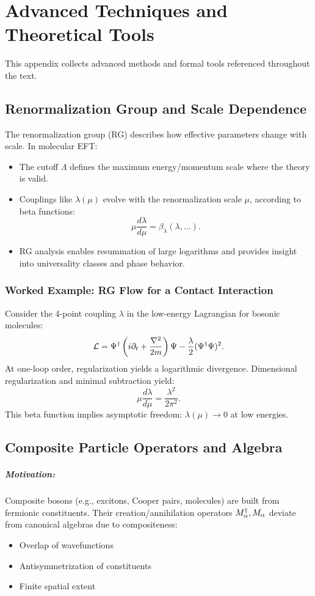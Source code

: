 \chapter{Advanced Techniques and Theoretical Tools}
\label{app:techniques}

This appendix collects advanced methods and formal tools referenced throughout the text.

\section{Renormalization Group and Scale Dependence}
\label{app:rg}

The renormalization group (RG) describes how effective parameters change with scale. In molecular EFT:
\begin{itemize}
  \item The cutoff \(\Lambda\) defines the maximum energy/momentum scale where the theory is valid.
  \item Couplings like \(\lambda(\mu)\) evolve with the renormalization scale \(\mu\), according to beta functions:
  \[ \mu \frac{d\lambda}{d\mu} = \beta_\lambda(\lambda, \dots). \]
  \item RG analysis enables resummation of large logarithms and provides insight into universality classes and phase behavior.
\end{itemize}

\subsection*{Worked Example: RG Flow for a Contact Interaction}
Consider the 4-point coupling \(\lambda\) in the low-energy Lagrangian for bosonic molecules:
\[
  \mathcal{L} = \Psi^\dagger \left(i\partial_t + \frac{\nabla^2}{2m}\right) \Psi - \frac{\lambda}{2} (\Psi^\dagger \Psi)^2.
\]
At one-loop order, regularization yields a logarithmic divergence. Dimensional regularization and minimal subtraction yield:
\[
  \mu \frac{d\lambda}{d\mu} = \frac{\lambda^2}{2\pi^2}.
\]
This beta function implies asymptotic freedom: \(\lambda(\mu) \to 0\) at low energies.

\section{Composite Particle Operators and Algebra}
\label{app:composite_algebra}

\paragraph{Motivation:} Composite bosons (e.g., excitons, Cooper pairs, molecules) are built from fermionic constituents. Their creation/annihilation operators \(M^\dagger_{\alpha}, M_{\alpha}\) deviate from canonical algebras due to compositeness:
\begin{itemize}
  \item Overlap of wavefunctions
  \item Antisymmetrization of constituents
  \item Finite spatial extent
\end{itemize}

